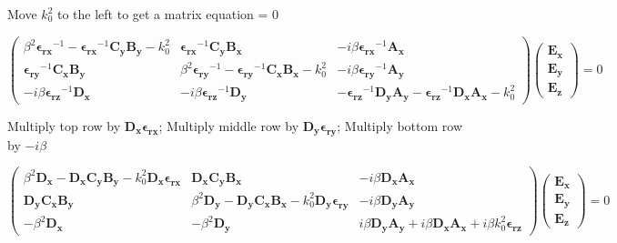 \documentclass[]{article}
\begin{document}
Move $k_0^2$ to the left to get a matrix equation = 0

\begin{equation*}
\begin{pmatrix}
\beta^2 \mathbf{\epsilon_{rx}}^{-1} - \mathbf{\epsilon_{rx}}^{-1} \mathbf{C_y}\mathbf{B_y} - k_0^2
&
\mathbf{\epsilon_{rx}}^{-1} \mathbf{C_y} \mathbf{B_x}
&
-i \beta \mathbf{\epsilon_{rx}}^{-1} \mathbf{A_x}
\\
\mathbf{\epsilon_{ry}}^{-1} \mathbf{C_x}\mathbf{B_y}
&
\beta^2 \mathbf{\epsilon_{ry}}^{-1} - \mathbf{\epsilon_{ry}}^{-1} \mathbf{C_x}\mathbf{B_x} - k_0^2
&
-i \beta \mathbf{\epsilon_{ry}}^{-1} \mathbf{A_y}
\\
-i \beta \mathbf{\epsilon_{rz}}^{-1} \mathbf{D_x}
&
-i \beta \mathbf{\epsilon_{rz}}^{-1} \mathbf{D_y}
&
-\mathbf{\epsilon_{rz}}^{-1} \mathbf{D_y} \mathbf{A_y} - \mathbf{\epsilon_{rz}}^{-1} \mathbf{D_x}\mathbf{A_x} - k_0^2
\end{pmatrix}
\begin{pmatrix}
\mathbf{E_x} \\
\mathbf{E_y} \\
\mathbf{E_z}
\end{pmatrix}
=0
\end{equation*}

Multiply top row by $\mathbf{D_x} \mathbf{\epsilon_{rx}}$; Multiply middle row by $\mathbf{D_y} \mathbf{\epsilon_{ry}}$;  Multiply bottom row by $-i \beta$

\begin{equation*}
\begin{pmatrix}
\beta^2 \mathbf{D_x} - \mathbf{D_x} \mathbf{C_y} \mathbf{B_y} - k_0^2 \mathbf{D_x} \mathbf{\epsilon_{rx}}
&
\mathbf{D_x} \mathbf{C_y} \mathbf{B_x}
&
-i \beta \mathbf{D_x} \mathbf{A_x}
\\
\mathbf{D_y} \mathbf{C_x} \mathbf{B_y}
&
\beta^2 \mathbf{D_y} - \mathbf{D_y} \mathbf{C_x}\mathbf{B_x} - k_0^2 \mathbf{D_y} \mathbf{\epsilon_{ry}} 
&
-i \beta \mathbf{D_y} \mathbf{A_y}
\\
-\beta^2 \mathbf{D_x}
&
-\beta^2 \mathbf{D_y}
&
i \beta \mathbf{D_y} \mathbf{A_y} + i \beta \mathbf{D_x}\mathbf{A_x} + i \beta k_0^2 \mathbf{\epsilon_{rz}}
\end{pmatrix}
\begin{pmatrix}
\mathbf{E_x} \\
\mathbf{E_y} \\
\mathbf{E_z}
\end{pmatrix}
=0
\end{equation*}
\end{document}
